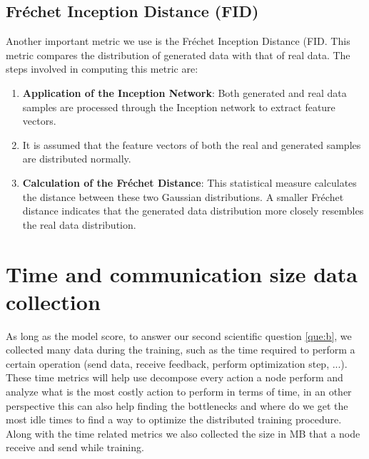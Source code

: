 \subsection{Fréchet Inception Distance (FID)}
Another important metric we use is the Fréchet Inception Distance (FID. This metric compares the distribution of generated data with that of real data. The steps involved in computing this metric are:

\begin{enumerate}
    \item \textbf{Application of the Inception Network}: Both generated and real data samples are processed through the Inception network to extract feature vectors.
        \item It is assumed that the feature vectors of both the real and generated samples are distributed normally.
    \item \textbf{Calculation of the Fréchet Distance}: This statistical measure calculates the distance between these two Gaussian distributions. A smaller Fréchet distance indicates that the generated data distribution more closely resembles the real data distribution.
\end{enumerate}

\section{Time and communication size data collection}
As long as the model score, to answer our second scientific question \ref{que:b}, we collected many data during the training, such as the time required to perform a certain operation (send data, receive feedback, perform optimization step, ...). These time metrics will help use decompose every action a node perform and analyze what is the most costly action to perform in terms of time, in an other perspective this can also help finding the bottlenecks and where do we get the most idle times to find a way to optimize the distributed training procedure. Along with the time related metrics we also collected the size in MB that a node receive and send while training.
